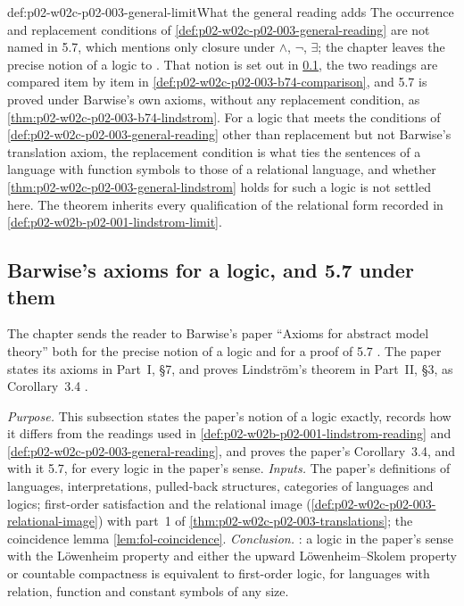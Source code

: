 \begin{hbwarning}{def:p02-w02c-p02-003-general-limit}{What the general reading adds}
The occurrence and replacement conditions of
\cref{def:p02-w02c-p02-003-general-reading} are not named in 5.7, which
mentions only closure under \(\land\), \(\neg\), \(\exists\); the chapter
leaves the precise notion of a logic to \cite{Barwise1974Axioms}.  That
notion is set out in \cref{sec:p02-w02c-p02-003-b74}, the two readings are
compared item by item in \cref{def:p02-w02c-p02-003-b74-comparison}, and
5.7 is proved under Barwise's own axioms, without any replacement
condition, as \cref{thm:p02-w02c-p02-003-b74-lindstrom}.  For a logic that
meets the conditions of \cref{def:p02-w02c-p02-003-general-reading} other
than replacement but not Barwise's translation axiom, the replacement
condition is what ties the sentences of a language with function symbols to
those of a relational language, and whether
\cref{thm:p02-w02c-p02-003-general-lindstrom} holds for such a logic is not
settled here.  The theorem inherits every qualification of the relational
form recorded in \cref{def:p02-w02b-p02-001-lindstrom-limit}.
\end{hbwarning}

\subsection{Barwise's axioms for a logic, and 5.7 under them}
\label{sec:p02-w02c-p02-003-b74}

The chapter sends the reader to Barwise's paper ``Axioms for abstract
model theory'' both for the precise notion of a logic and for a proof of
5.7 \cite[ch.~A.1, \S5, 5.6--5.7, p.~45]{Barwise1977FirstOrder}.  The
paper states its axioms in Part~I, \S7, and proves Lindstr\"om's theorem in
Part~II, \S3, as Corollary~3.4 \cite[Part~II, \S3, 3.4,
p.~259]{Barwise1974Axioms}.

\emph{Purpose.}  This subsection states the paper's notion of a logic
exactly, records how it differs from the readings used in
\cref{def:p02-w02b-p02-001-lindstrom-reading} and
\cref{def:p02-w02c-p02-003-general-reading}, and proves the paper's
Corollary~3.4, and with it 5.7, for every logic in the paper's sense.
\emph{Inputs.}  The paper's definitions of languages, interpretations,
pulled-back structures, categories of languages and logics; first-order
satisfaction and the relational image
(\cref{def:p02-w02c-p02-003-relational-image}) with part~1 of
\cref{thm:p02-w02c-p02-003-translations}; the coincidence lemma
\cref{lem:fol-coincidence}.  \emph{Conclusion.}
: a logic in the paper's sense
with the L\"owenheim property and either the upward L\"owenheim--Skolem
property or countable compactness is equivalent to first-order logic, for
languages with relation, function and constant symbols of any size.

